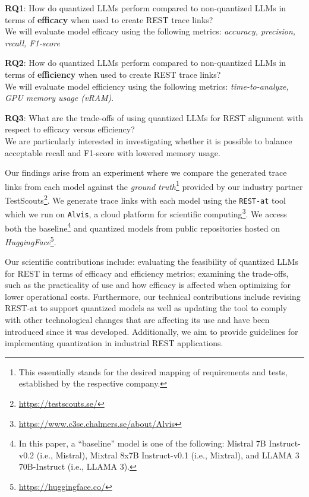 \documentclass[conference]{IEEEtran}
\begin{document}
\begin{RQBox}
    \textbf{RQ1}: How do quantized LLMs perform compared to non-quantized LLMs
    in terms of \textbf{efficacy} when used to create REST trace links?\\[0.5em]
    We will evaluate model efficacy using the following metrics: \textit{accuracy, precision, recall, F1-score}
\end{RQBox}


\begin{RQBox}
    \textbf{RQ2}: How do quantized LLMs perform compared to non-quantized LLMs in
    terms of \textbf{efficiency} when used to create REST trace links? \\[0.5em]
    We will evaluate model efficiency using the following metrics: \textit{time-to-analyze, GPU memory usage (vRAM)}.
\end{RQBox}

\begin{RQBox}
    \textbf{RQ3}: What are the trade-offs of using quantized LLMs for REST alignment
    with respect to efficacy versus efficiency? \\[0.5em]
    We are particularly interested in investigating whether it is possible to balance acceptable recall and F1-score with lowered memory usage.
\end{RQBox}


\newcommand{\modelsFootnote}{In this paper, a ``baseline'' model is one of the following: Mistral 7B Instruct-v0.2 (i.e., Mistral), Mixtral 8x7B Instruct-v0.1 (i.e., Mixtral), and LLAMA 3 70B-Instruct (i.e., LLAMA 3).} 

Our findings arise from an experiment where we compare the generated trace links from each model against the \textit{ground truth}\footnote{This essentially stands for the desired mapping of requirements and tests, established by the respective company.} provided by our industry partner TestScouts\footnote{\url{https://testscouts.se/}}. We generate trace links with each model using the \verb|REST-at| tool which we run on \verb|Alvis|, a cloud platform for scientific computing\footnote{\url{https://www.c3se.chalmers.se/about/Alvis}}. We access both the baseline\footnote{\label{baselineModels}\modelsFootnote} and quantized models from public repositories hosted on \textit{HuggingFace}\footnote{\url{https://huggingface.co/}}.

Our scientific contributions include: evaluating the feasibility of quantized LLMs for REST in terms of efficacy and efficiency metrics; examining the trade-offs, such as the practicality of use and how efficacy is affected when optimizing for lower operational costs. Furthermore, our technical contributions include revising REST-at to support quantized models as well as updating the tool to comply with other technological changes that are affecting its use and have been introduced since it was developed. Additionally, we aim to provide guidelines for implementing quantization in industrial REST applications.
\end{document}
